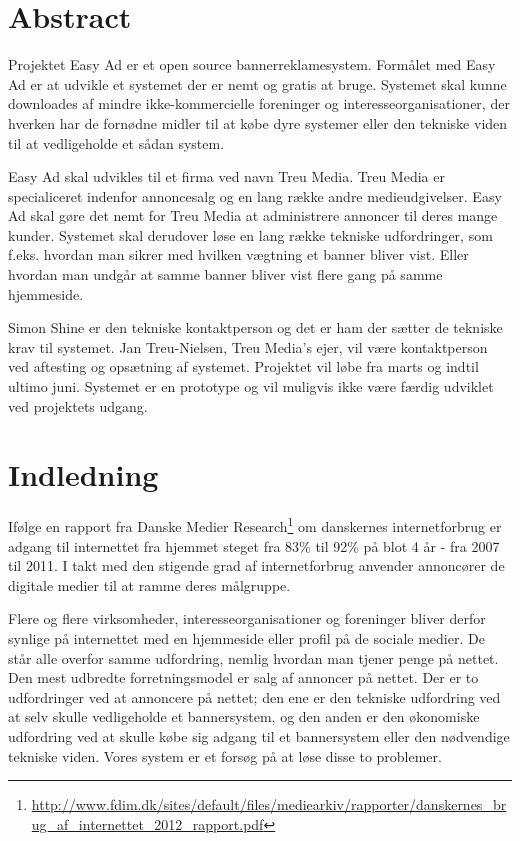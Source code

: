 \documentclass[a4paper,12pt]{article}
\begin{document}
\section{Abstract}

Projektet Easy Ad er et open source bannerreklamesystem. Formålet med Easy Ad er at udvikle et systemet der er nemt og gratis at bruge. Systemet skal kunne downloades af mindre ikke-kommercielle foreninger og interesseorganisationer, der hverken har de fornødne midler til at købe dyre systemer eller den tekniske viden til at vedligeholde et sådan system.

Easy Ad skal udvikles til et firma ved navn Treu Media. Treu Media er specialiceret indenfor annoncesalg og en lang række andre medieudgivelser. Easy Ad skal gøre det nemt for Treu Media at administrere annoncer til deres mange kunder. Systemet skal derudover løse en lang række tekniske udfordringer, som f.eks. hvordan man sikrer med hvilken vægtning et banner bliver vist. Eller hvordan man undgår at samme banner bliver vist flere gang på samme hjemmeside.

Simon Shine er den tekniske kontaktperson og det er ham der sætter de tekniske krav til systemet. Jan Treu-Nielsen, Treu Media's ejer, vil være kontaktperson ved aftesting og opsætning af systemet. Projektet vil løbe fra marts og indtil ultimo juni. Systemet er en prototype og vil muligvis ikke være færdig udviklet ved projektets udgang. 

\newpage

\section{Indledning}

Ifølge en rapport fra Danske Medier Research\footnote{\url{ http://www.fdim.dk/sites/default/files/mediearkiv/rapporter/danskernes\_brug\_af\_internettet\_2012\_rapport.pdf}} om danskernes internetforbrug er adgang til internettet fra hjemmet steget fra 83\% til 92\% på blot 4 år - fra 2007 til 2011. I takt med den stigende grad af internetforbrug anvender annoncører de digitale medier til at ramme deres målgruppe.

Flere og flere virksomheder, interesseorganisationer og foreninger bliver derfor synlige på internettet med en hjemmeside eller profil på de sociale medier. De står alle overfor samme udfordring, nemlig hvordan man tjener penge på nettet. Den mest udbredte forretningsmodel er salg af annoncer på nettet. Der er to udfordringer ved at annoncere på nettet; den ene er den tekniske udfordring ved at selv skulle vedligeholde et bannersystem, og den anden er den økonomiske udfordring ved at skulle købe sig adgang til et bannersystem eller den nødvendige tekniske viden. Vores system er et forsøg på at løse disse to problemer.
\end{document}
